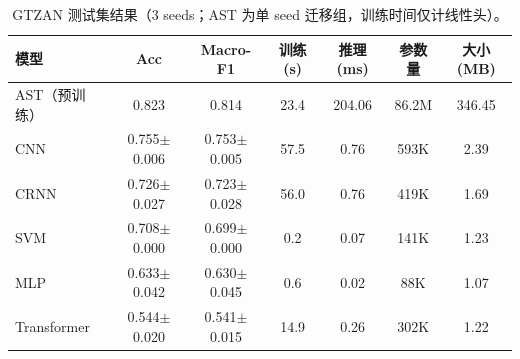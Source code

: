 \begin{table}[H]
\centering\small
\caption{GTZAN 测试集结果（3 seeds；AST 为单 seed 迁移组，训练时间仅计线性头）。}
\label{tab:gtzan}
\begin{tabular}{lcccccc}
\toprule
模型 & Acc & Macro-F1 & 训练(s) & 推理(ms) & 参数量 & 大小(MB)\\
\midrule
AST（预训练） & 0.823 & 0.814 & 23.4 & 204.06 & 86.2M & 346.45\\
CNN & 0.755$\pm$0.006 & 0.753$\pm$0.005 & 57.5 & 0.76 & 593K & 2.39\\
CRNN & 0.726$\pm$0.027 & 0.723$\pm$0.028 & 56.0 & 0.76 & 419K & 1.69\\
SVM & 0.708$\pm$0.000 & 0.699$\pm$0.000 & 0.2 & 0.07 & 141K & 1.23\\
MLP & 0.633$\pm$0.042 & 0.630$\pm$0.045 & 0.6 & 0.02 & 88K & 1.07\\
Transformer & 0.544$\pm$0.020 & 0.541$\pm$0.015 & 14.9 & 0.26 & 302K & 1.22\\
\bottomrule
\end{tabular}
\end{table}
